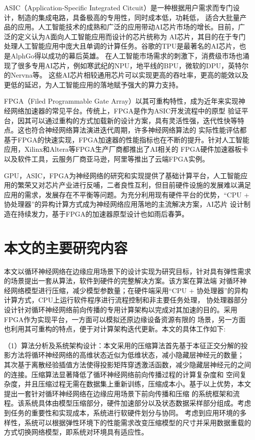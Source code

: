 ASIC（Application-Specific Integrated Citcuit）是一种根据用户需求而专门设计，制造的集成电路，具备极高的专用性，同时成本低，功耗低，
适合大批量产品的应用。人工智能技术的成熟和广泛的应用带动AI芯片市场的增长。目前，广泛的定义认为A面向人工智能应用而设计的芯片统称为
AI芯片，其目的在于专门处理人工智能应用中庞大且单调的计算任务。谷歌的TPU是最著名的AI芯片，也是AlphGo得以成功的幕后英雄。
在人工智能市场需求的刺激下，消费级市场也涌现了很多专用AI芯片，例如寒武纪的NPU，地平线的BPU，微软的DPU，英特尔的Nervna等。
这些AI芯片相较通用芯片可以实现更高的吞吐率，更高的能效以及更低的延迟，为人工智能应用的落地赋予强大的算力支持。

FPGA（Filed Programmable Gate Array）以其可重构特性，成为近年来实现神经网络加速器的常见平台。传统上，FPGA是作为ASIC开发流程中的原型
验证平台，因其可以通过重构的方式加载新的设计方案，具有灵活性强，迭代性快等特点。这也符合神经网络算法演进迭代周期，许多神经网络算法的
实际性能评估都基于FPGA的快速实现，FPGA加速器的性能指标也在不断的提升。针对人工智能应用，Xilinx和Altera等FPGA生产厂商都推出了AI相关的
FPGA硬件加速器板卡以及软件工具，云服务厂商亚马逊，阿里等推出了云端FPGA实例。

GPU，ASIC，FPGA为神经网络的研究和实现提供了基础计算平台，人工智能应用的繁荣又对芯片产业进行反哺，二者良性互利，但目前硬件设施的发展难以满足
应用的需求，发展存在不平衡等问题。为充分利用现有硬件平台的优势，“CPU + 协处理器”的异构计算方式成为神经网络应用落地的主流解决方案，AI芯片
设计制造在持续发力，基于FPGA的加速器原型设计也如雨后春笋。
\section{本文的主要研究内容}
本文以循环神经网络在边缘应用场景下的设计实现为研究目标，针对具有弹性需求的场景提出一套从算法，软件到硬件的完整解决方案。该方案在算法端
对循环神经网络模型进行压缩，减少模型参数量；在硬件端采用“CPU + 协处理器”的异构计算方式，CPU上运行软件程序进行流程控制和非主要任务处理，
协处理器部分设计针对循环神经网络前向传播的专用计算架构以完成对其加速的目的。采用FPGA作为实现平台，一方面可以模拟还原边缘设备资源有限的
场景，另一方面也利用其可重构的特点，便于对计算架构迭代更新。本文的具体工作如下:

（1）算法分析及系统架构设计：本文采用的压缩算法首先基于本征正交分解的投影方法将循环神经网络的高维状态近似为低维状态，减小隐藏层神经元的数量；
其次基于离散经验插值方法使得投影矩阵穿透激活函数，减少隐藏层神经元的之间的连接。压缩算法显著降低了循环神经网络前向传播过程的计算复杂度和
空间复杂度，并且压缩过程无需在数据集上重新训练，压缩成本小。基于以上优势，本文提出一套针对循环神经网络在边缘应用场景下前向传播和压缩
的系统框架和流程。该系统具体由模型压缩部分，硬件加速部分以及状态数据采样部分组成。考虑到任务的重要性和实现成本，系统进行软硬件划分与协同。
考虑到应用环境的多样性，系统可以根据弹性环境下的性能需求改变压缩模型的尺寸并采用数据重载的方式切换网络模型，即系统对环境具有适应性。

